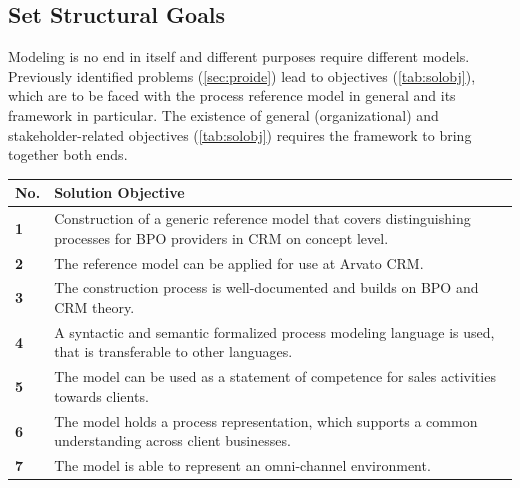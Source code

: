 	\subsection{Set Structural Goals}
	
	Modeling is no end in itself and different purposes require different models. Previously identified problems (\ref{sec:proide}) lead to objectives (\Tab \ref{tab:solobj}), which are to be faced with the process reference model in general and its framework in particular. The existence of general (organizational) and stakeholder-related objectives (\cf \Tab \ref{tab:solobj}) requires the framework to bring together both ends.
	
	\begin{table}[caption={Solution Objectives}, label={tab:solobj}]
		\centering
		\begin{tabular}{l p{13.3cm}}

			\textbf{No. }&\textbf{ Solution Objective}
			 \\ \hline
			\textbf{1 }                        & Construction of a generic reference model that covers distinguishing processes for BPO providers in CRM on concept level.                                                    \\ \hline
			\textbf{2}                         & The reference model can be applied for use at Arvato CRM.                                                                                                                    \\ \hline
			\textbf{3 }                        & The construction process is well-documented and builds on \acrshort{BPO} and \acrshort{CRM} theory.\\ \hline
			\textbf{4}                         & A syntactic and semantic formalized process modeling language is used, that is transferable to other languages.                                                              \\ \hline
			\textbf{5}                         & The model can be used as a statement of competence for sales activities towards clients.                                                                                     \\ \hline
			\textbf{6}                         & The model holds a process representation, which supports a common understanding across client businesses.                                                                    \\ \hline
			\textbf{7}                         & The model is able to represent an omni-channel environment.                                                                                                                 
		\end{tabular}
	\end{table}

